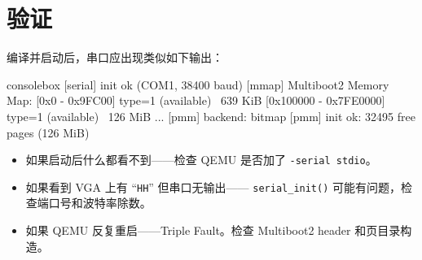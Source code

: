 \section{验证}

编译并启动后，串口应出现类似如下输出：

\begin{tcblisting}{consolebox}
[serial] init ok (COM1, 38400 baud)
[mmap] Multiboot2 Memory Map:
  [0x0 - 0x9FC00] type=1 (available)   ~639 KiB
  [0x100000 - 0x7FE0000] type=1 (available)  ~126 MiB
  ...
[pmm] backend: bitmap
[pmm] init ok: 32495 free pages (126 MiB)
\end{tcblisting}

\begin{itemize}
  \item 如果启动后什么都看不到——检查 QEMU 是否加了 \texttt{-serial stdio}。
  \item 如果看到 VGA 上有 ``\texttt{HH}'' 但串口无输出——
        \texttt{serial\_init()} 可能有问题，检查端口号和波特率除数。
  \item 如果 QEMU 反复重启——Triple Fault。检查 Multiboot2 header 和页目录构造。
\end{itemize}


